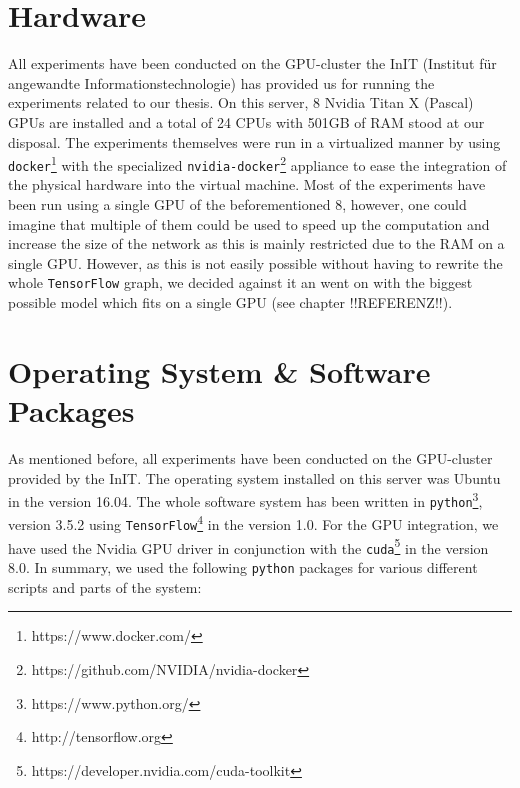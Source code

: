 \section{Hardware}
\label{software_system:hardware}
All experiments have been conducted on the GPU-cluster the InIT (Institut für angewandte Informationstechnologie) has provided us for running the experiments related to our thesis. On this server, 8 Nvidia Titan X (Pascal) GPUs are installed and a total of 24 CPUs with 501GB of RAM stood at our disposal. The experiments themselves were run in a virtualized manner by using \texttt{docker}\footnote{https://www.docker.com/} with the specialized \texttt{nvidia-docker}\footnote{https://github.com/NVIDIA/nvidia-docker} appliance to ease the integration of the physical hardware into the virtual machine. Most of the experiments have been run using a single GPU of the beforementioned 8, however, one could imagine that multiple of them could be used to speed up the computation and increase the size of the network as this is mainly restricted due to the RAM on a single GPU. However, as this is not easily possible without having to rewrite the whole \texttt{TensorFlow} graph, we decided against it an went on with the biggest possible model which fits on a single GPU (see chapter !!REFERENZ!!).

\section{Operating System \& Software Packages}
\label{software_system:softwar_packages}
As mentioned before, all experiments have been conducted on the GPU-cluster provided by the InIT. The operating system installed on this server was Ubuntu in the version 16.04. The whole software system has been written in \texttt{python}\footnote{https://www.python.org/}, version 3.5.2 using \texttt{TensorFlow}\footnote{http://tensorflow.org} in the version 1.0. For the GPU integration, we have used the Nvidia GPU driver in conjunction with the \texttt{cuda}\footnote{https://developer.nvidia.com/cuda-toolkit} in the version 8.0. In summary, we used the following \texttt{python} packages for various different scripts and parts of the system:

